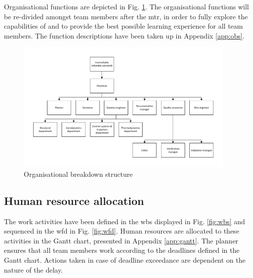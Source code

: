 Organisational functions are depicted in Fig. \ref{fig:obs}. The organisational functions will be re-divided amongst team members after the \gls{mtr}, in order to fully explore the capabilities of and to provide the best possible learning experience for all team members. The function descriptions have been taken up in Appendix \ref{app:obs}.

\begin{figure}[H]
\centering
\includegraphics[width=0.95\textwidth]{./Figure/OBS_MTR.pdf}
\caption{Organisational breakdown structure} \label{fig:OBS}
\label{fig:obs}
\end{figure}

\subsection{Human resource allocation}
\label{sec:gantt}
The work activities have been defined in the \gls{wbs} displayed in Fig. \ref{fig:wbs} and sequenced in the \gls{wfd} in Fig. \ref{fig:wfd}. Human resources are allocated to these activities in the Gantt chart, presented in Appendix \ref{app:gantt}. The planner ensures that all team members work according to the deadlines defined in the Gantt chart. Actions taken in case of deadline exceedance are dependent on the nature of the delay.
